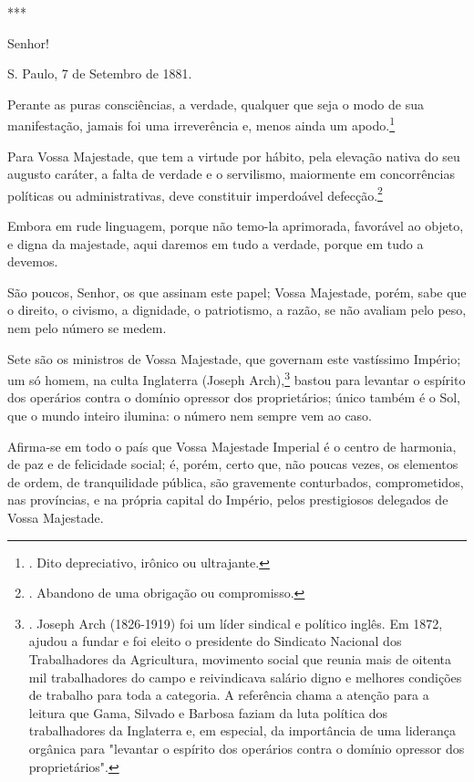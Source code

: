 ***

Senhor!

S. Paulo, 7 de Setembro de 1881.

Perante as puras consciências, a verdade, qualquer que seja o modo de
sua manifestação, jamais foi uma irreverência e, menos ainda um
apodo.\footnote{. Dito depreciativo, irônico ou ultrajante.}

Para Vossa Majestade, que tem a virtude por hábito, pela elevação nativa
do seu augusto caráter, a falta de verdade e o servilismo, maiormente em
concorrências políticas ou administrativas, deve constituir imperdoável
defecção.\footnote{. Abandono de uma obrigação ou compromisso.}

Embora em rude linguagem, porque não temo-la aprimorada, favorável ao
objeto, e digna da majestade, aqui daremos em tudo a verdade, porque em
tudo a devemos.

São poucos, Senhor, os que assinam este papel; Vossa Majestade, porém,
sabe que o direito, o civismo, a dignidade, o patriotismo, a razão, se
não avaliam pelo peso, nem pelo número se medem.

Sete são os ministros de Vossa Majestade, que governam este vastíssimo
Império; um só homem, na culta Inglaterra (Joseph Arch),\footnote{.
  Joseph Arch (1826-1919) foi um líder sindical e político inglês. Em
  1872, ajudou a fundar e foi eleito o presidente do Sindicato Nacional
  dos Trabalhadores da Agricultura, movimento social que reunia mais de
  oitenta mil trabalhadores do campo e reivindicava salário digno e
  melhores condições de trabalho para toda a categoria. A referência
  chama a atenção para a leitura que Gama, Silvado e Barbosa faziam da
  luta política dos trabalhadores da Inglaterra e, em especial, da
  importância de uma liderança orgânica para "levantar o espírito dos
  operários contra o domínio opressor dos proprietários".} bastou para
levantar o espírito dos operários contra o domínio opressor dos
proprietários; único também é o Sol, que o mundo inteiro ilumina: o
número nem sempre vem ao caso.

Afirma-se em todo o país que Vossa Majestade Imperial é o centro de
harmonia, de paz e de felicidade social; é, porém, certo que, não poucas
vezes, os elementos de ordem, de tranquilidade pública, são gravemente
conturbados, comprometidos, nas províncias, e na própria capital do
Império, pelos prestigiosos delegados de Vossa Majestade.

